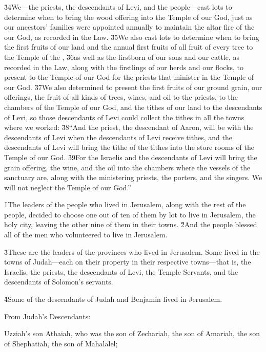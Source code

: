 \v{34}We---the priests, the descendants of Levi, and the people---cast lots to determine when to bring the wood offering into the Temple of our God, just as our ancestors' families were appointed annually to maintain the altar fire of the  our God, as recorded in the Law. \v{35}We also cast lots to determine when to bring the first fruits of our land and the annual first fruits of all fruit of every tree to the Temple of the , \v{36}as well as the firstborn of our sons and our cattle, as recorded in the Law, along with the firstlings of our herds and our flocks, to present to the Temple of our God for the priests that minister in the Temple of our God. \v{37}We also determined to present the first fruits of our ground grain, our offerings, the fruit of all kinds of trees, wines, and oil to the priests, to the chambers of the Temple of our God, and the tithes of our land to the descendants of Levi, so those descendants of Levi could collect the tithes in all the towns where we worked: \v{38}``And the priest, the descendant of Aaron, will be with the descendants of Levi when the descendants of Levi receive tithes, and the descendants of Levi will bring the tithe of the tithes into the store rooms of the Temple of our God. \v{39}For the Israelis and the descendants of Levi will bring the grain offering, the wine, and the oil into the chambers where the vessels of the sanctuary are, along with the ministering priests, the porters, and the singers. We will not neglect the Temple of our God.''

\v{1}The leaders of the people who lived in Jerusalem, along with the rest of the people, decided to choose one out of ten of them by lot to live in Jerusalem, the holy city, leaving the other nine of them in their towns. \v{2}And the people blessed all of the men who volunteered to live in Jerusalem.

\v{3}These are the leaders of the provinces who lived in Jerusalem. Some lived in the towns of Judah---each on their property in their respective towns---that is, the Israelis, the priests, the descendants of Levi, the Temple Servants, and the descendants of Solomon's servants.

\v{4}Some of the descendants of Judah and Benjamin lived in Jerusalem.

From Judah's Descendants:

Uzziah's son Athaiah, who was the son of Zechariah, the son of Amariah, the son of Shephatiah, the son of Mahalalel;

